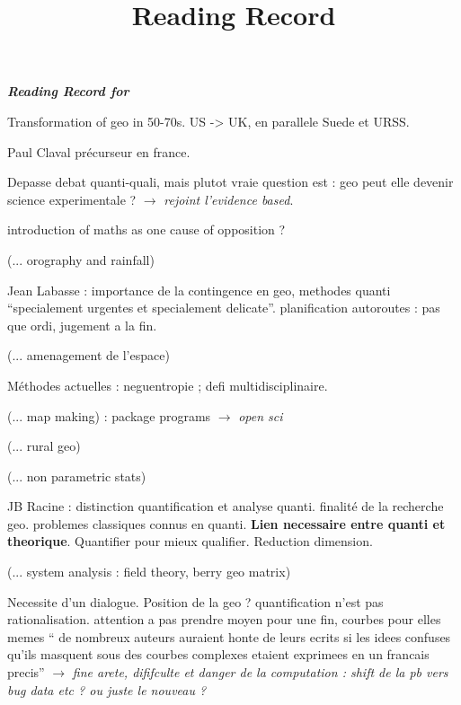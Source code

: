 


\title{Reading Record\bigskip\\
\cite{racine1971quantitative}
}


\maketitle

\textbf{\textit{Reading Record for \cite{racine1971quantitative}}}


Transformation of geo in 50-70s. US -> UK, en parallele Suede et URSS.

Paul Claval précurseur en france.

Depasse debat quanti-quali, mais plutot vraie question est : geo peut elle devenir science experimentale ? $\rightarrow$ \textit{rejoint l'evidence based}.

introduction of maths as one cause of opposition ?

(... orography and rainfall)

Jean Labasse : importance de la contingence en geo, methodes quanti ``specialement urgentes et specialement delicate''. planification autoroutes : pas que ordi, jugement a la fin.

(... amenagement de l'espace)


Méthodes actuelles : neguentropie ; defi multidisciplinaire.

(... map making) : package programs $\rightarrow$ \textit{open sci}

(... rural geo)

(... non parametric stats)

JB Racine : distinction quantification et analyse quanti. finalité de la recherche geo. problemes classiques connus en quanti. \textbf{Lien necessaire entre quanti et theorique}. Quantifier pour mieux qualifier. Reduction dimension. 

(... system analysis : field theory, berry geo matrix)

Necessite d'un dialogue. Position de la geo ? quantification n'est pas rationalisation. attention a pas prendre moyen pour une fin, courbes pour elles memes `` de nombreux auteurs auraient honte de leurs ecrits si les idees confuses qu'ils masquent sous des courbes complexes etaient exprimees en un francais precis'' $\rightarrow$ \textit{fine arete, dififculte et danger de la computation : shift de la pb vers bug data etc ? ou juste le nouveau ?}

